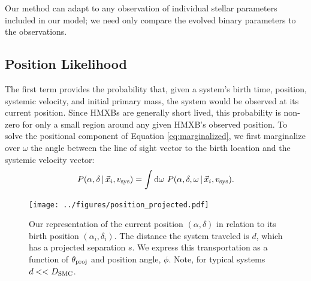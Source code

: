 \documentclass[usenatbib]{mnras}
\newcommand{\given}{\,|\,}
\newcommand{\dd}{\mathrm{d}}
\begin{document}
Our method can adapt to any observation of individual stellar parameters included in our model; we need only compare the evolved binary parameters to the observations.


\subsection{Position Likelihood}
The first term provides the probability that, given a system's birth time, position, systemic velocity, and initial primary mass, the system would be observed at its current position. Since HMXBs are generally short lived, this probability is non-zero for only a small region around any given HMXB's observed position. To solve the positional component of Equation \ref{eq:marginalized}, we first marginalize over $\omega$ the angle between the line of sight vector to the birth location and the systemic velocity vector:
\begin{equation}
P(\alpha, \delta \given \vec{x}_i, v_{\rm sys} ) = \int \dd \omega\ P(\alpha, \delta, \omega \given \vec{x}_i, v_{\rm sys} ). \label{eq:P_pos_1}
\end{equation}

\begin{figure}[h!]
\begin{center}
\texttt{[image: ../figures/position\_projected.pdf]}
\caption{Our representation of the current position $(\alpha, \delta)$ in relation to its birth position $(\alpha_i, \delta_i)$. The distance the system traveled is $d$, which has a projected separation $s$. We express this transportation as a function of $\theta_{\rm proj}$ and position angle, $\phi$. Note, for typical systems $d << D_{\rm SMC}$.}
\label{fig:position_projection}
\end{center}
\end{figure}
\end{document}
